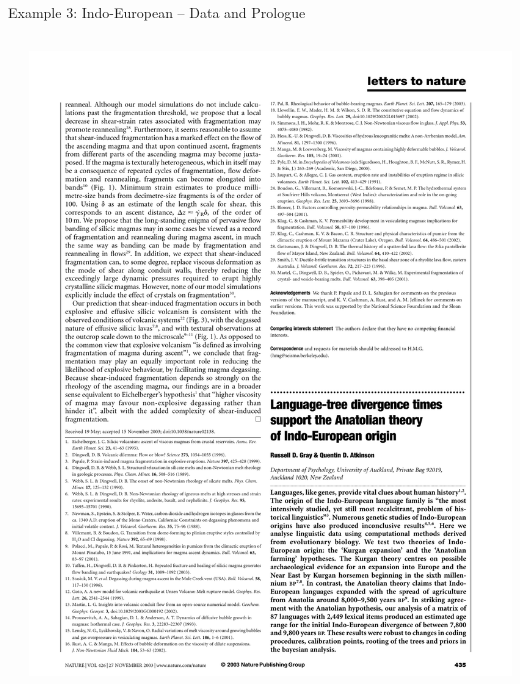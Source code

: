 \documentclass[9pt]{beamer}
\begin{document}
\begin{frame}{Example 3: Indo-European – Data and Prologue}
  \begin{columns}
    \begin{column}{0.5\textwidth}
      
    \end{column}
    \begin{column}{0.5\textwidth}
      \footnotemark\includegraphics[width=\textwidth,page=3,trim={2.2cm 4.6cm 2.7cm 5.0cm},clip]{gray2003language.pdf}
    \end{column}
  \end{columns}
\end{frame}
\end{document}
